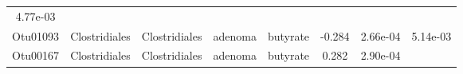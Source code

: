 \documentclass[11pt,]{article}
\begin{document}
\begin{longtable}[]{@{}cccccccc@{}}
\begin{minipage}[t]{0.08\columnwidth}
4.77e-03\strut
\end{minipage}\tabularnewline
\begin{minipage}[t]{0.08\columnwidth}\centering\strut
Otu01093\strut
\end{minipage} & \begin{minipage}[t]{0.15\columnwidth}\centering\strut
Clostridiales\strut
\end{minipage} & \begin{minipage}[t]{0.15\columnwidth}\centering\strut
Clostridiales\strut
\end{minipage} & \begin{minipage}[t]{0.08\columnwidth}\centering\strut
adenoma\strut
\end{minipage} & \begin{minipage}[t]{0.09\columnwidth}\centering\strut
butyrate\strut
\end{minipage} & \begin{minipage}[t]{0.07\columnwidth}\centering\strut
-0.284\strut
\end{minipage} & \begin{minipage}[t]{0.08\columnwidth}\centering\strut
2.66e-04\strut
\end{minipage} & \begin{minipage}[t]{0.08\columnwidth}\centering\strut
5.14e-03\strut
\end{minipage}\tabularnewline
\begin{minipage}[t]{0.08\columnwidth}\centering\strut
Otu00167\strut
\end{minipage} & \begin{minipage}[t]{0.15\columnwidth}\centering\strut
Clostridiales\strut
\end{minipage} & \begin{minipage}[t]{0.15\columnwidth}\centering\strut
Clostridiales\strut
\end{minipage} & \begin{minipage}[t]{0.08\columnwidth}\centering\strut
adenoma\strut
\end{minipage} & \begin{minipage}[t]{0.09\columnwidth}\centering\strut
butyrate\strut
\end{minipage} & \begin{minipage}[t]{0.07\columnwidth}\centering\strut
0.282\strut
\end{minipage} & \begin{minipage}[t]{0.08\columnwidth}\centering\strut
2.90e-04\strut
\end{minipage} & \begin{minipage}[t]{0.08\columnwidth}\centering\strut

\end{minipage}
\end{longtable}
\end{document}
